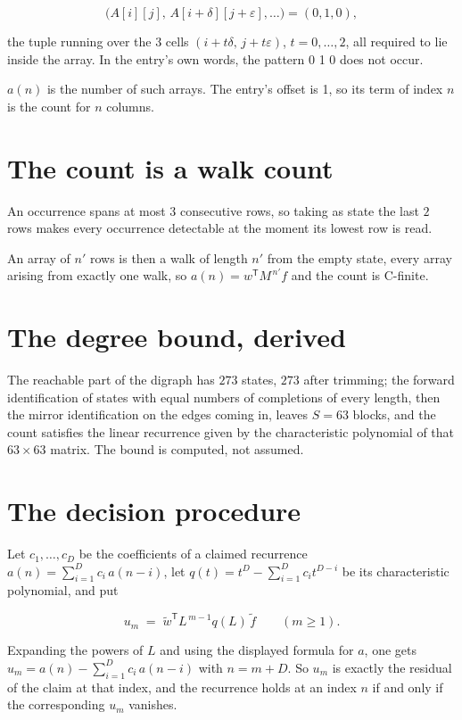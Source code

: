 \documentclass[11pt]{article}
\theoremstyle{definition}
\begin{document}
\[\bigl(A[i][j],\,A[i{+}\delta][j{+}\varepsilon],\dots\bigr) = (0, 1, 0),\]

the tuple running over the $3$ cells $(i+t\delta,\,j+t\varepsilon)$, $t = 0,\dots,2$, all required to lie inside the array. In the entry's own words, the pattern 0 1 0 does not occur.

$a(n)$ is the number of such arrays. The entry's offset is 1, so its term of index $n$ is the count for $n$ columns.

\section{The count is a walk count}

An occurrence spans at most $3$ consecutive rows, so taking as state the last $2$ rows makes every occurrence detectable at the moment its lowest row is read.

An array of $n'$ rows is then a walk of length $n'$ from the empty state, every array arising from exactly one walk, so $a(n) = w^{\mathsf T}M^{\,n'}f$ and the count is C-finite.

\section{The degree bound, derived}

The reachable part of the digraph has $273$ states, $273$ after trimming; the forward identification of states with equal numbers of completions of every length, then the mirror identification on the edges coming in, leaves $S = 63$ blocks, and the count satisfies the linear recurrence given by the characteristic polynomial of that $63\times63$ matrix. The bound is computed, not assumed.

\section{The decision procedure}

Let $c_1,\dots,c_D$ be the coefficients of a claimed recurrence $a(n) = \sum_{i=1}^{D} c_i\,a(n-i)$, let $q(t) = t^{D} - \sum_{i=1}^{D} c_i t^{D-i}$ be its characteristic polynomial, and put

\[u_m \;=\; \tilde w^{\mathsf T} L^{\,m-1} q(L)\,\tilde f \qquad (m \ge 1).\]

Expanding the powers of $L$ and using the displayed formula for $a$, one gets $u_m = a(n) - \sum_{i=1}^{D} c_i\,a(n-i)$ with $n = m + D$. So $u_m$ is exactly the residual of the claim at that index, and the recurrence holds at an index $n$ if and only if the corresponding $u_m$ vanishes.
\end{document}
